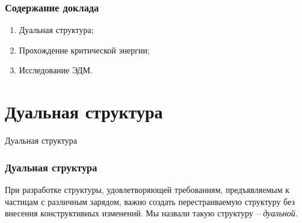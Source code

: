 
\begin{frame}
	\frametitle{Содержание доклада}
	\begin{enumerate}
	\item Дуальная структура;\newline
	\item Прохождение критической энергии;\newline
	\item Исследование ЭДМ.
	\end{enumerate}
\end{frame}
\section{Дуальная структура}
\begin{frame}
	\centering \Large{Дуальная структура}
\end{frame}
\begin{frame}
	\frametitle{Дуальная структура}
	При разработке структуры, удовлетворяющей требованиям, предъявляемым к частицам с различным зарядом, важно создать перестраиваемую структуру без внесения конструктивных изменений. Мы назвали такую структуру -- \textit{дуальной}.
	\vspace{2em} 
	
	\begin{columns}
		\begin{column}{0.5\textwidth}
			\raggedright
		\end{column}
		\hfill
		\begin{column}{0.5\textwidth}
			\raggedright
		\end{column}
		\begin{column}{0.01\textwidth}
		\end{column}
	\end{columns}
	\vspace{2em}
\end{frame}
